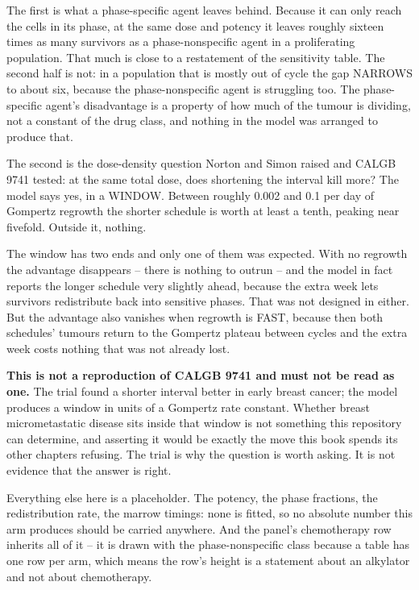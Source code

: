 \documentclass[11pt,twoside,openright]{report}
\begin{document}
\begin{finding}
The first is what a phase-specific agent leaves behind. Because it can only reach the cells in its phase, at the same dose and potency it leaves roughly sixteen times as many survivors as a phase-nonspecific agent in a proliferating population. That much is close to a restatement of the sensitivity table. The second half is not: in a population that is mostly out of cycle the gap NARROWS to about six, because the phase-nonspecific agent is struggling too. The phase-specific agent's disadvantage is a property of how much of the tumour is dividing, not a constant of the drug class, and nothing in the model was arranged to produce that.

The second is the dose-density question Norton and Simon raised and CALGB 9741 tested: at the same total dose, does shortening the interval kill more? The model says yes, in a WINDOW. Between roughly 0.002 and 0.1 per day of Gompertz regrowth the shorter schedule is worth at least a tenth, peaking near fivefold. Outside it, nothing.
\end{finding}

\begin{refusal}
The window has two ends and only one of them was expected. With no regrowth the advantage disappears -- there is nothing to outrun -- and the model in fact reports the longer schedule very slightly ahead, because the extra week lets survivors redistribute back into sensitive phases. That was not designed in either. But the advantage also vanishes when regrowth is FAST, because then both schedules' tumours return to the Gompertz plateau between cycles and the extra week costs nothing that was not already lost.

\textbf{This is not a reproduction of CALGB 9741 and must not be read as one.} The trial found a shorter interval better in early breast cancer; the model produces a window in units of a Gompertz rate constant. Whether breast micrometastatic disease sits inside that window is not something this repository can determine, and asserting it would be exactly the move this book spends its other chapters refusing. The trial is why the question is worth asking. It is not evidence that the answer is right.

Everything else here is a placeholder. The potency, the phase fractions, the redistribution rate, the marrow timings: none is fitted, so no absolute number this arm produces should be carried anywhere. And the panel's chemotherapy row inherits all of it -- it is drawn with the phase-nonspecific class because a table has one row per arm, which means the row's height is a statement about an alkylator and not about chemotherapy.
\end{refusal}
\end{document}
